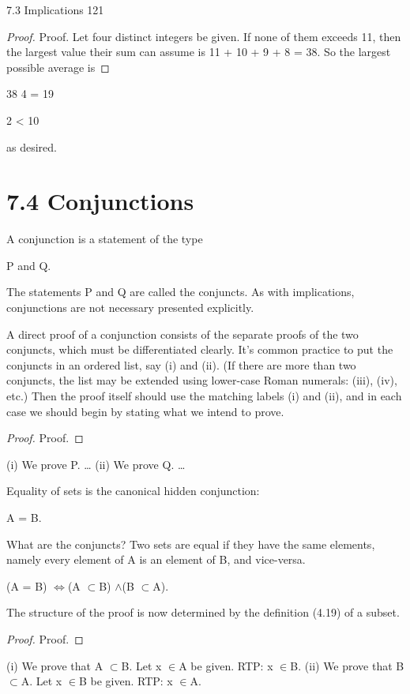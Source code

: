 \documentclass[11pt]{article}
\theoremstyle{plain}
\theoremstyle{definition}
\begin{document}
7.3 Implications 121

\begin{proof}
Proof. Let four distinct integers be given. If none of them exceeds 11, then the largest value their sum can assume is 11 + 10 + 9 + 8 = 38. So the largest possible average is
\end{proof}

38 4 = 19

2 < 10

as desired. 

\section{7.4 Conjunctions}

A conjunction is a statement of the type

P and Q.

The statements P and Q are called the conjuncts. As with implications, conjunctions are not necessary presented explicitly.

A direct proof of a conjunction consists of the separate proofs of the two conjuncts, which must be differentiated clearly. It's common practice to put the conjuncts in an ordered list, say (i) and (ii). (If there are more than two conjuncts, the list may be extended using lower-case Roman numerals: (iii), (iv), etc.) Then the proof itself should use the matching labels (i) and (ii), and in each case we should begin by stating what we intend to prove.

\begin{proof}
Proof.
\end{proof}

(i) We prove P. \dots{} (ii) We prove Q. \dots{}

Equality of sets is the canonical hidden conjunction:

A = B.

What are the conjuncts? Two sets are equal if they have the same elements, namely every element of A is an element of B, and vice-versa.

(A = B) $\Leftrightarrow$(A $\subset$B) $\land$(B $\subset$A).

The structure of the proof is now determined by the definition (4.19) of a subset.

\begin{proof}
Proof.
\end{proof}

(i) We prove that A $\subset$B. Let x $\in$A be given. RTP: x $\in$B. (ii) We prove that B $\subset$A. Let x $\in$B be given. RTP: x $\in$A.
\end{document}
